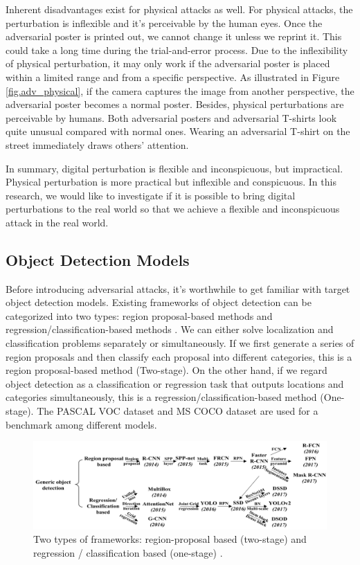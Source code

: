 
Inherent disadvantages exist for physical attacks as well. For physical attacks, the perturbation is inflexible and it's perceivable by the human eyes. Once the adversarial poster is printed out, we cannot change it unless we reprint it. This could take a long time during the trial-and-error process. Due to the inflexibility of physical perturbation, it may only work if the adversarial poster is placed within a limited range and from a specific perspective. As illustrated in Figure \ref{fig.adv_physical}, if the camera captures the image from another perspective, the adversarial poster becomes a normal poster. Besides, physical perturbations are perceivable by humans. Both adversarial posters and adversarial T-shirts look quite unusual compared with normal ones. Wearing an adversarial T-shirt on the street immediately draws others' attention. 

In summary, digital perturbation is flexible and inconspicuous, but impractical. Physical perturbation is more practical but inflexible and conspicuous. In this research, we would like to investigate if it is possible to bring digital perturbations to the real world so that we achieve a flexible and inconspicuous attack in the real world.

\subsection{Object Detection Models}

Before introducing adversarial attacks, it's worthwhile to get familiar with target object detection models. Existing frameworks of object detection can be categorized into two types: region proposal-based methods and regression/classification-based methods \citep{Zhao2019}. We can either solve localization and classification problems separately or simultaneously. If we first generate a series of region proposals and then classify each proposal into different categories, this is a region proposal-based method (Two-stage). On the other hand, if we regard object detection as a classification or regression task that outputs locations and categories simultaneously, this is a regression/classification-based method (One-stage). The PASCAL VOC dataset and MS COCO dataset are used for a benchmark among different models.

\begin{figure}[H]
\centering
\includegraphics[scale=0.6]{figures/chapter_detection/detection_review.png}
\caption{Two types of frameworks: region-proposal based (two-stage) and regression / classification based (one-stage) \citep{Zhao2019}.}
\label{fig.detection_frame}
\end{figure}

